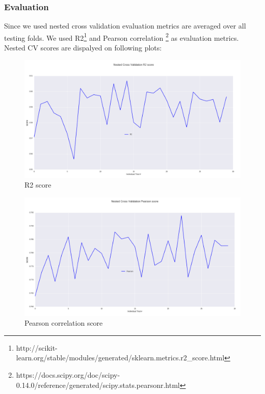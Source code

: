 \documentclass[10pt, a4paper]{article}
\begin{document}
\subsubsection{Evaluation}
Since we used nested cross validation evaluation metrics are averaged over all testing folds. We used R2\footnote{http://scikit-learn.org/stable/modules/generated/sklearn.metrics.r2\_score.html} and Pearson correlation
\footnote{https://docs.scipy.org/doc/scipy-0.14.0/reference/generated/scipy.stats.pearsonr.html} as evaluation metrics. Nested CV scores are dispalyed on following plots:


\begin{figure}
\begin{center}
	\centering
	\includegraphics[scale=0.36]{R2.png}
	\caption{R2 score}
\end{center}
\end{figure}


\begin{figure}
\begin{center}
	\centering
	\includegraphics[scale=0.36]{Pearson.png}
	\caption{Pearson correlation score}
\end{center}
\end{figure}
\end{document}
